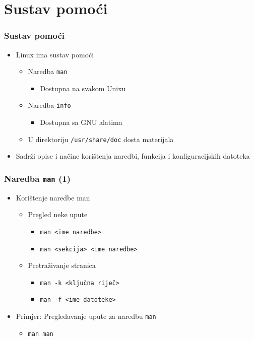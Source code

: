 \documentclass{beamer}
\newcommand{\shell}[1]{\texttt{#1}}
\begin{document}
\section{Sustav pomoći}
\begin{frame}[t]
\frametitle{Sustav pomoći}
\begin{itemize}
  \item Linux ima sustav pomoći
  \begin{itemize}
    \item Naredba \shell{man}
    \begin{itemize}
      \item Dostupna na svakom Unixu
    \end{itemize}
    \item Naredba \shell{info}
    \begin{itemize}
      \item Dostupna sa GNU alatima
    \end{itemize}
    \item U direktoriju \shell{/usr/share/doc} dosta materijala
  \end{itemize}
  \item Sadrži opise i načine korištenja naredbi, funkcija i 
        konfiguracijskih datoteka
\end{itemize}
\end{frame}

\begin{frame}[t]
\frametitle{Naredba \shell{man} (1)}
\begin{itemize}
  \item Korištenje naredbe man
  \begin{itemize}
    \item Pregled neke upute
    \begin{itemize}
      \item \shell{man <ime naredbe>}
      \item \shell{man <sekcija> <ime naredbe>}
    \end{itemize}
    \item Pretraživanje stranica
    \begin{itemize}
      \item \shell{man -k <ključna riječ>}
      \item \shell{man -f <ime datoteke>}
    \end{itemize}
  \end{itemize}
  \item Primjer: Pregledavanje upute za naredbu \shell{man}
  \begin{itemize}
    \item \shell{man man}
  \end{itemize}
\end{itemize}
\end{frame}
\end{document}
